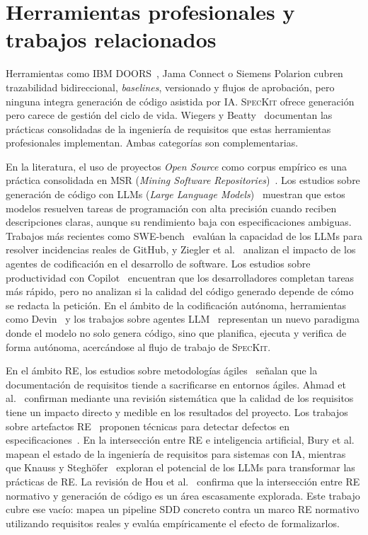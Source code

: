 \section{Herramientas profesionales y trabajos relacionados}

Herramientas como IBM DOORS~\cite{ibmdoors}, Jama Connect o Siemens Polarion cubren trazabilidad bidireccional, \emph{baselines}, versionado y flujos de aprobaci\'on, pero ninguna integra generaci\'on de c\'odigo asistida por IA. \textsc{SpecKit} ofrece generaci\'on pero carece de gesti\'on del ciclo de vida. Wiegers y Beatty~\cite{wiegers2013software} documentan las pr\'acticas consolidadas de la ingenier\'ia de requisitos que estas herramientas profesionales implementan. Ambas categor\'ias son complementarias.

En la literatura, el uso de proyectos \emph{Open Source} como corpus emp\'irico es una pr\'actica consolidada en MSR (\emph{Mining Software Repositories})~\cite{hassan2019msr}. Los estudios sobre generaci\'on de c\'odigo con LLMs (\emph{Large Language Models})~\cite{chen2021codex,xu2022llmse,wei2022chainofthought} muestran que estos modelos resuelven tareas de programaci\'on con alta precisi\'on cuando reciben descripciones claras, aunque su rendimiento baja con especificaciones ambiguas. Trabajos m\'as recientes como SWE-bench~\cite{yang2024swebench} eval\'uan la capacidad de los LLMs para resolver incidencias reales de GitHub, y Ziegler et al.~\cite{ziegler2024codingagents} analizan el impacto de los agentes de codificaci\'on en el desarrollo de software. Los estudios sobre productividad con Copilot~\cite{ziegler2024productivity} encuentran que los desarrolladores completan tareas m\'as r\'apido, pero no analizan si la calidad del c\'odigo generado depende de c\'omo se redacta la petici\'on. En el \'ambito de la codificaci\'on aut\'onoma, herramientas como Devin~\cite{devin2024} y los trabajos sobre agentes LLM~\cite{wang2023agentic} representan un nuevo paradigma donde el modelo no solo genera c\'odigo, sino que planifica, ejecuta y verifica de forma aut\'onoma, acerc\'andose al flujo de trabajo de \textsc{SpecKit}.

En el \'ambito RE, los estudios sobre metodolog\'ias \'agiles~\cite{daneva2013agilere} se\~nalan que la documentaci\'on de requisitos tiende a sacrificarse en entornos \'agiles. Ahmad et al.~\cite{ahmad2023requirements} confirman mediante una revisi\'on sistem\'atica que la calidad de los requisitos tiene un impacto directo y medible en los resultados del proyecto. Los trabajos sobre artefactos RE~\cite{femmer2014reartifacts} proponen t\'ecnicas para detectar defectos en especificaciones~\cite{fagan}. En la intersecci\'on entre RE e inteligencia artificial, Bury et al.~\cite{bury2022re4ai} mapean el estado de la ingenier\'ia de requisitos para sistemas con IA, mientras que Knauss y Stegh\"ofer~\cite{knauss2022llmrequirements} exploran el potencial de los LLMs para transformar las pr\'acticas de RE. La revisi\'on de Hou et al.~\cite{hou2024llmcodereview} confirma que la intersecci\'on entre RE normativo y generaci\'on de c\'odigo es un \'area escasamente explorada. Este trabajo cubre ese vac\'io: mapea un pipeline SDD concreto contra un marco RE normativo utilizando requisitos reales y eval\'ua emp\'iricamente el efecto de formalizarlos.

